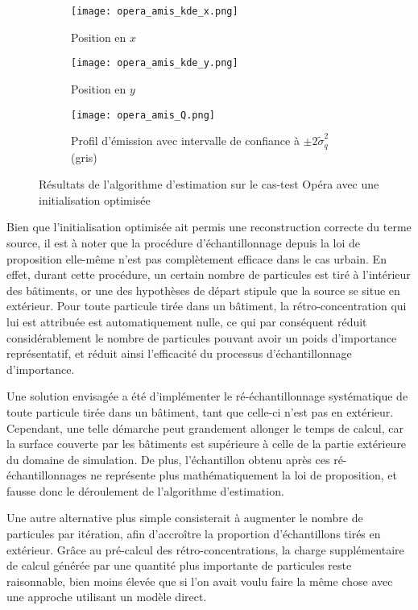 \begin{figure}[h!]
	\centering
	\begin{subfigure}[t]{0.5\textwidth}
		\centering
		\texttt{[image: opera\_amis\_kde\_x.png]}
		\caption{Position en $x$}
		\label{opera_amis_x}
	\end{subfigure}%
	\begin{subfigure}[t]{0.5\textwidth}
		\centering
		\texttt{[image: opera\_amis\_kde\_y.png]}
		\caption{Position en $y$}
		\label{opera_amis_y}
	\end{subfigure}
	\begin{subfigure}[t]{0.65\textwidth}
		\centering
		\texttt{[image: opera\_amis\_Q.png]}
		\caption{Profil d'émission avec intervalle de confiance à  $\pm 2 \widetilde{\sigma}_q^2$ (gris)}
		\label{opera_amis_q}
	\end{subfigure} 
	\caption{Résultats de l'algorithme d'estimation sur le cas-test Opéra avec une initialisation optimisée}
	\label{fig_opera_amis}
\end{figure}

Bien que l'initialisation optimisée ait permis une { reconstruction correcte} du terme source, il est à noter que la procédure d'échantillonnage depuis la loi de proposition elle-même n'est pas complètement efficace dans le cas urbain. En effet, durant cette procédure, un certain nombre de particules est tiré à l'intérieur des bâtiments, or une des hypothèses de départ stipule que la source se situe en extérieur. Pour toute particule tirée dans un bâtiment, la rétro-concentration qui lui est attribuée est automatiquement nulle, ce qui par conséquent réduit considérablement le nombre de particules pouvant avoir un poids d'importance représentatif, et réduit ainsi l'efficacité du processus d'échantillonnage d'importance. 

Une solution envisagée a été d'implémenter le ré-échantillonnage systématique de toute particule tirée dans un bâtiment, tant que celle-ci n'est pas en extérieur. Cependant, une telle démarche peut grandement allonger le temps de calcul, car la surface couverte par les bâtiments est supérieure à celle {de la partie extérieure du domaine de simulation}. De plus, l'échantillon obtenu après ces ré-échantillonnages ne représente plus mathématiquement la loi de proposition, et fausse donc le déroulement de l'algorithme d'estimation. 

Une autre alternative plus simple consisterait à augmenter le nombre de particules par itération, afin d'accroître la proportion d'échantillons tirés en extérieur. {Grâce au pré-calcul des rétro-concentrations, la charge supplémentaire de calcul générée par une quantité plus importante de particules reste raisonnable, bien moins élevée que si l'on avait voulu faire la même chose avec une approche utilisant un modèle direct.}\\

